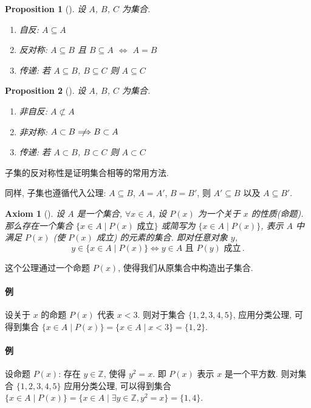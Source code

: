 \documentclass[UTF8]{ctexart}
\theoremstyle{mystyle}
\newtheorem{axiom}{Axiom}[section]
\newtheorem{proposition}{Proposition}[section]
\theoremstyle{myremark}
\theoremstyle{plain}
\newcommand{\Z}{\mathbb Z}
\newcommand{\set}[1]{\{#1\}}
\begin{document}
\begin{proposition}[]
    设 $ A $, $ B $, $ C $ 为集合. 
    \begin{enumerate}
        \item 自反: $ A \subseteq A $
        \item 反对称: $ A \subseteq B $ 且 $ B \subseteq A $ $ \Longleftrightarrow $ $ A = B $
        \item 传递: 若 $ A \subseteq B $, $ B \subseteq C $ 则 $ A \subseteq C $
    \end{enumerate}
\end{proposition}

\begin{proposition}[]
    设 $ A $, $ B $, $ C $ 为集合. 
    \begin{enumerate}
        \item 非自反: $ A \not\subset A $
        \item 非对称: $ A \subset B \centernot \Longrightarrow B \subset A $ 
        \item 传递: 若 $ A \subset B $, $ B \subset C $ 则 $ A \subset C $
    \end{enumerate}
\end{proposition}

子集的反对称性是证明集合相等的常用方法.

同样, 子集也遵循代入公理: $ A \subseteq B $, $ A = A' $, $ B = B' $, 则 $ A' \subseteq B $ 以及 $ A \subseteq B' $.

\begin{axiom}[]
    设 $ A $ 是一个集合, $ \forall x \in A $, 设 $ P(x) $ 为一个关于 $ x $ 的性质(命题). 那么存在一个集合 $ \{ x \in A \mid P(x) \text{ 成立} \} $ 或简写为 $ \{ x \in A \mid P(x) \} $, 表示 $ A $ 中满足 $ P(x) $ (使 $ P(x) $ 成立) 的元素的集合. 即对任意对象 $ y $, \[ y \in \{x \in A \mid P(x)\} \Longleftrightarrow y \in A \text{ 且 } P(y) \text{ 成立} \,.\]
\end{axiom}

这个公理通过一个命题 $ P(x) $, 使得我们从原集合中构造出子集合. 

\paragraph{例} 设关于 $ x $ 的命题 $ P(x) $ 代表 $ x < 3 $. 则对于集合 $ \set{1, 2, 3, 4, 5} $, 应用分类公理, 可得到集合 $ \set{x \in A \mid P(x)} = \set{x \in A \mid x < 3} = \set{1, 2} $.

\paragraph{例} 设命题 $ P(x) $: 存在 $ y \in \Z $, 使得 $ y^2 = x $. 即 $ P(x) $ 表示 $ x $ 是一个平方数. 则对集合 $ \set{1, 2, 3, 4, 5} $ 应用分类公理, 可以得到集合 $ \set{x \in A \mid P(x)} = \set{x \in A \mid \exists y \in \Z, y^2 = x} = \set{1, 4} $.
\end{document}
